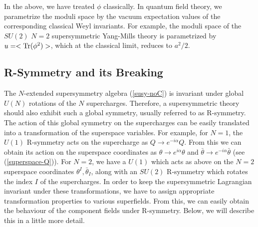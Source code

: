 In the above, we have treated $\phi$ classically. In quantum field
theory, we parametrize the moduli space by the vacuum expectation
values of the corresponding classical Weyl invariants. For example,
the moduli space of the $SU(2)\,\,N=2$ supersymmetric Yang-Mills
theory is parametrized by $u=<{\rm Tr}(\phi^2)>$, which at the
classical limit, reduces to $a^2/2$.
 
\subsection{R-Symmetry and its Breaking}

The $N$-extended supersymmetry algebra (\ref{susy-noC}) is invariant
under global $U(N)$ rotations of the $N$ supercharges. Therefore, a
supersymmetric theory should also exhibit such a global symmetry,
usually referred to as R-symmetry. The action of this global symmetry
on the supercharges can be easily translated into a transformation of
the superspace variables. For example, for $N=1$, the $U(1)$
R-symmetry acts on the supercharge as $Q\rightarrow
e^{-i\alpha}Q$. From this we can obtain its action on the superspace
coordinates as $\theta\rightarrow e^{i\alpha}\theta$ and
$\bar\theta\rightarrow e^{-i\alpha}\bar\theta$ (see
(\ref{superspace-Q})).  For $N=2$, we have a $U(1)$ which acts as
above on the $N=2$ superspace coordinates $\theta^I, \bar\theta_I$,
along with an $SU(2)$ R-symmetry which rotates the index $I$ of the
supercharges. In order to keep the supersymmetric Lagrangian invariant
under these transformations, we have to assign appropriate
transformation properties to various superfields. From this, we can
easily obtain the behaviour of the component fields under
R-symmetry. Below, we will describe this in a little more detail.

